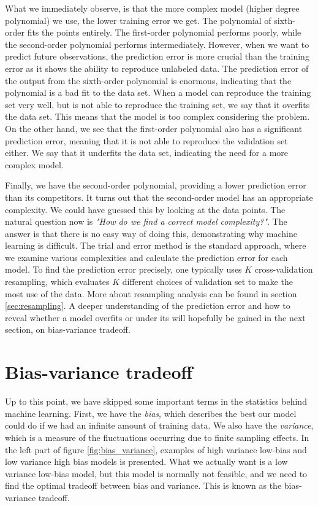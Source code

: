 What we immediately observe, is that the more complex model (higher degree polynomial) we use, the lower training error we get. The polynomial of sixth-order fits the points entirely. The first-order polynomial performs poorly, while the second-order polynomial performs intermediately. However, when we want to predict future observations, the prediction error is more crucial than the training error as it shows the ability to reproduce unlabeled data. The prediction error of the output from the sixth-order polynomial is enormous, indicating that the polynomial is a bad fit to the data set. When a model can reproduce the training set very well, but is not able to reproduce the training set, we say that it overfits the data set. This means that the model is too complex considering the problem. On the other hand, we see that the first-order polynomial also has a significant prediction error, meaning that it is not able to reproduce the validation set either. We say that it underfits the data set, indicating the need for a more complex model.

Finally, we have the second-order polynomial, providing a lower prediction error than its competitors. It turns out that the second-order model has an appropriate complexity. We could have guessed this by looking at the data points. The natural question now is \textit{"How do we find a correct model complexity?"}. The answer is that there is no easy way of doing this, demonstrating why machine learning is difficult. The trial and error method is the standard approach, where we examine various complexities and calculate the prediction error for each model. To find the prediction error precisely, one typically uses $K$ cross-validation resampling, which evaluates $K$ different choices of validation set to make the most use of the data. More about resampling analysis can be found in section \ref{sec:resampling}. A deeper understanding of the prediction error and how to reveal whether a model overfits or under its will hopefully be gained in the next section, on bias-variance tradeoff. 

\section{Bias-variance tradeoff}
Up to this point, we have skipped some important terms in the statistics behind machine learning. First, we have the \textit{bias}, which describes the best our model could do if we had an infinite amount of training data. We also have the \textit{variance}, which is a measure of the fluctuations occurring due to finite sampling effects. In the left part of figure \eqref{fig:bias_variance}, examples of high variance low-bias and low variance high bias models is presented. What we actually want is a low variance low-bias model, but this model is normally not feasible, and we need to find the optimal tradeoff between bias and variance. This is known as the bias-variance tradeoff. 

